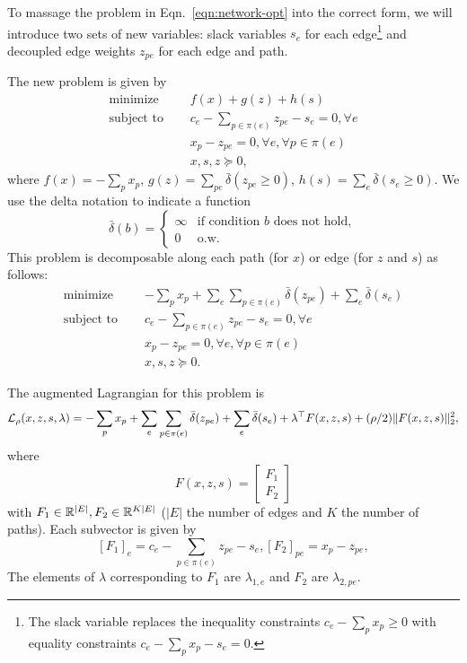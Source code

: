 \documentclass[11pt]{article}
\begin{document}
To massage the problem in Eqn.~\ref{eqn:network-opt} into the correct form,
we will introduce two sets of new variables: slack variables $s_e$ for each edge\footnote{
The slack variable replaces the inequality constraints $c_e - \sum_p x_p \ge 0$
with equality constraints $c_e - \sum_p x_p - s_e = 0$.
}
and decoupled edge weights $z_{pe}$ for each edge and path.

The new problem is given by
\begin{equation}
\label{eqn:network-opt-std}
\begin{aligned}
\textrm{minimize } \quad & f(x) + g(z) + h(s)\\
\textrm{subject to } \quad &c_e - \sum_{p\in\pi(e)}z_{pe} - s_{e} = 0, \forall e\\
&x_p - z_{pe} = 0, \forall e, \forall p \in \pi(e)\\
&x,s,z \succeq 0,
\end{aligned}
\end{equation}
where $f(x) = -\sum_p x_p$,
$g(z) = \sum_{pe} \bar\delta(z_{pe} \ge 0)$, $h(s) = \sum_{e} \bar\delta(s_{e} \ge 0)$.
We use the delta notation to indicate a function
$$
\bar\delta(b) = \begin{cases}
    \infty & \textrm{if condition } b \textrm{ does not hold},\\
    0 & \textrm{o.w.}
\end{cases}
$$
This problem is decomposable along each path (for $x$) or edge (for $z$ and $s$) as follows:
\begin{equation}
\label{eqn:network-opt-sep}
\begin{aligned}
\textrm{minimize } \quad & -\sum_p x_p
    + \sum_e\sum_{p \in \pi(e)} \bar\delta(z_{pe})
    + \sum_e \bar\delta(s_{e})\\
\textrm{subject to } \quad &c_e - \sum_{p\in\pi(e)}z_{pe} - s_{e} = 0, \forall e\\
&x_p - z_{pe} = 0, \forall e, \forall p \in \pi(e)\\
&x,s,z \succeq 0.
\end{aligned}
\end{equation}

The augmented Lagrangian for this problem is
\begin{equation}
    \label{eqn:network-lagrangian}
    \mathcal{L}_\rho(x,z,s,\lambda) =-\sum_p x_p + \sum_e\sum_{p\in\pi(e)} \bar\delta(z_{pe})
        + \sum_{e} \bar\delta(s_{e})
        + \lambda^\top F(x,z,s)
        + (\rho/2)\| F(x,z,s) \|_2^2,
\end{equation}
where
$$F(x,z,s) =
\begin{bmatrix}
F_1 \\
F_2
\end{bmatrix}
$$
with $F_1 \in \mathbb{R}^{|E|}, F_2\in\mathbb{R}^{K|E|}$
($|E|$ the number of edges and $K$ the number of paths).
Each subvector is given by
$$
    [F_1]_e = c_e - \sum_{p\in\pi(e)}z_{pe} - s_{e},
    [F_2]_{pe} = x_p - z_{pe},
$$
The elements of $\lambda$ corresponding to $F_1$ are $\lambda_{1,e}$ and
$F_2$ are $\lambda_{2,pe}$.
\end{document}

